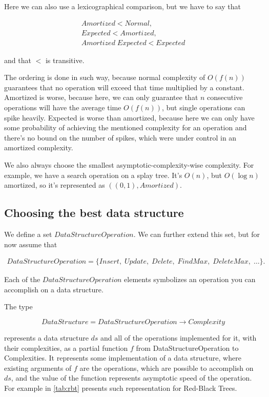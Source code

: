 \documentclass[a4paper,11pt]{article}
\begin{document}
		Here we can also use a lexicographical comparison, but we have to say that

		\begin{eqnarray}
			Amortized < Normal,\\
			Expected < Amortized,\\
			Amortized \; Expected < Expected
		\end{eqnarray}

		and that $<$ is transitive.

		The ordering is done in such way, because normal complexity of $O(f(n))$ guarantees that no operation
		will exceed that time multiplied by a constant. Amortized is worse, because here, we can only guarantee
		that $n$ consecutive operations will have the average time $O(f(n))$, but single operations can spike
		heavily. Expected is worse than amortized, because here we can only have some probability of achieving
		the mentioned complexity for an operation and there's no bound on the number of spikes, which were under
		control in an amortized complexity.

		We also always choose the smallest asymptotic-complexity-wise complexity.  For example, we have a search
		operation on a splay tree. It's $O(n)$, but $O(\log n)$ amortized, so it's represented as
		$((0,1),Amortized)$.

	\subsection{Choosing the best data structure} \label{sec:choose-ds}

		We define a set $DataStructureOperation$. We can further extend this set, but for now assume that

		\begin{eqnarray}
			DataStructureOperation = \{Insert, \; Update, \; Delete, \; FindMax,\; DeleteMax, \; \dots\}.
		\end{eqnarray}

		Each of the $DataStructureOperation$ elements symbolizes an operation you can accomplish on a data
		structure.

		The type

		\begin{equation}\label{data-structure-type}
			DataStructure = DataStructureOperation \rightarrow Complexity
		\end{equation}

		represents a data structure $ds$ and all of the operations implemented for it, with their complexities, as a
		partial function $f$ from DataStructureOperation to Complexities. It represents some implementation of a
		data structure, where existing arguments of $f$ are the operations, which are possible to accomplish on
		$ds$, and the value of the function represents asymptotic speed of the operation. For example in
		\autoref{tab:rbt} presents such representation for Red-Black Trees.
\end{document}
